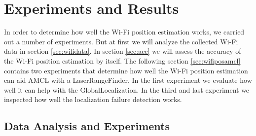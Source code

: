 \chapter{Experiments and Results} %
\label{Chapter4}
In order to determine how well the Wi-Fi position estimation works, we carried out a number of experiments. But at first we will analyze the collected Wi-Fi data in section \ref{sec:wifidata}. 
In section \ref{sec:acc} we will assess the accuracy of the Wi-Fi position estimation by itself.
The following section \ref{sec:wifiposamcl} contains two experiments that determine how well the Wi-Fi position estimation can aid AMCL with a \gls{LaserRangeFinder}. In the first experiment we evaluate how well it can help with the \gls{GlobalLocalization}. In the third and last experiment we inspected how well the localization failure detection works. 
\section{Data Analysis and Experiments}
